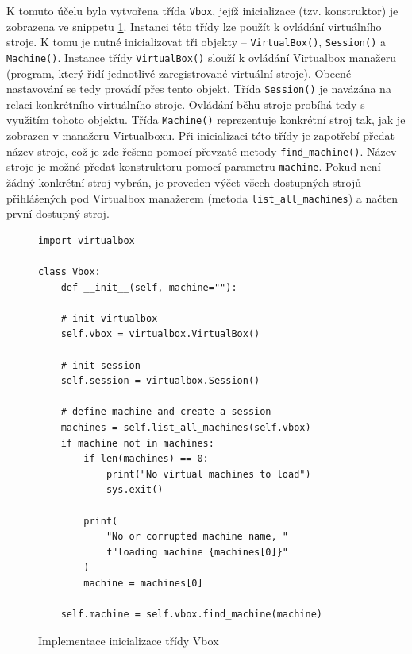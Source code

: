 \documentclass[thesis=M,czech,hidelinks]{FITthesis}[2013/05/06]
\begin{document}
K tomuto účelu byla vytvořena třída  \texttt{Vbox}, jejíž inicializace (tzv. konstruktor) je zobrazena ve snippetu \ref{snip:vboxmain}. Instanci této třídy lze použít k ovládání virtuálního stroje. K tomu je nutné inicializovat tři objekty – \texttt{VirtualBox()}, \texttt{Session()} a \texttt{Machine()}. Instance třídy \texttt{VirtualBox()} slouží k ovládání Virtualbox manažeru (program, který řídí jednotlivé zaregistrované virtuální stroje). Obecné nastavování se tedy provádí přes tento objekt. Třída \texttt{Session()} je navázána na relaci konkrétního virtuálního stroje. Ovládání běhu stroje probíhá tedy s využitím tohoto objektu. Třída \texttt{Machine()} reprezentuje konkrétní stroj tak, jak je zobrazen v manažeru Virtualboxu. Při inicializaci této třídy je zapotřebí předat název stroje, což je zde řešeno pomocí převzaté metody \texttt{find_machine()}. Název stroje je možné předat konstruktoru pomocí parametru \texttt{machine}. Pokud není žádný konkrétní stroj vybrán, je proveden výčet všech dostupných strojů přihlášených pod Virtualbox manažerem (metoda \texttt{list_all_machines}) a načten první dostupný stroj.
\begin{figure}[h]               
	\begin{verbatim}
import virtualbox

class Vbox:
    def __init__(self, machine=""):

    # init virtualbox
    self.vbox = virtualbox.VirtualBox()

    # init session
    self.session = virtualbox.Session()

    # define machine and create a session
    machines = self.list_all_machines(self.vbox)
    if machine not in machines:
        if len(machines) == 0:
            print("No virtual machines to load")
            sys.exit()

        print(
            "No or corrupted machine name, "
            f"loading machine {machines[0]}"
        )
        machine = machines[0]

    self.machine = self.vbox.find_machine(machine)
	\end{verbatim}      
	\caption{Implementace inicializace třídy Vbox}
	\label{snip:vboxmain}
\end{figure}
\end{document}
